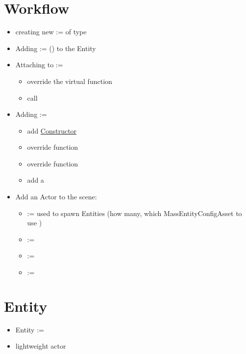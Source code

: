     \section{Workflow}
        \begin{itemize}
            \item creating new  :=  of type 
            \item Adding  := () to the Entity
            \item Attaching  to  :=
            \begin{itemize}
                \item override the  virtual function
                \item call 
            \end{itemize}  
            \item Adding  := 
            \begin{itemize}
                \item add \hyperref[MassConstructor]{Constructor}
                \item override   function
                \item override  function 
                \item add a 
            \end{itemize} 
            \item Add an Actor to the scene:
            \begin{itemize}
                \item {} := used to spawn Entities (how many, which MassEntityConfigAsset to use )
                \item {} := 
                \item {} := 
                \item {} := 
            \end{itemize}
        \end{itemize}


    \section{Entity}
        \begin{itemize}
            \item Entity :=
            \item lightweight actor
        \end{itemize}

